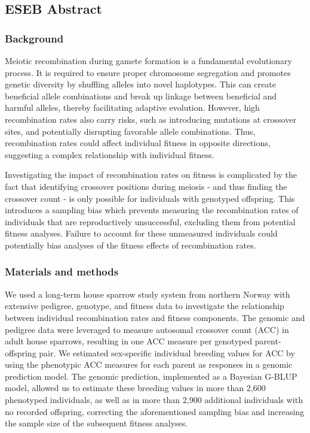 \documentclass[dvipsnames]{article}
\begin{document}

\maketitle
\newpage

\subsection*{ESEB Abstract}

\subsubsection*{Background}
Meiotic recombination during gamete formation is a fundamental evolutionary process. It is required to ensure proper chromosome segregation and promotes genetic diversity by shuffling alleles into novel haplotypes. This can create beneficial allele combinations and break up linkage between beneficial and harmful alleles, thereby facilitating adaptive evolution. However, high recombination rates also carry risks, such as introducing mutations at crossover sites, and potentially disrupting favorable allele combinations. Thus, recombination rates could affect individual fitness in opposite directions, suggesting a complex relationship with individual fitness.

Investigating the impact of recombination rates on fitness is complicated by the fact that identifying crossover positions during meiosis - and thus finding the crossover count - is only possible for individuals with genotyped offspring. This introduces a sampling bias which prevents measuring the recombination rates of individuals that are reproductively unsuccessful, excluding them from potential fitness analyses. Failure to account for these unmeasured individuals could potentially bias analyses of the fitness effects of recombination rates.

\subsubsection*{Materials and methods}
We used a long-term house sparrow study system from northern Norway with extensive pedigree, genotype, and fitness data to investigate the relationship between individual recombination rates and fitness components. The genomic and pedigree data were leveraged to measure autosomal crossover count (ACC) in adult house sparrows, resulting in one ACC measure per genotyped parent-offspring pair. We estimated sex-specific individual breeding values for ACC by using the phenotypic ACC measures for each parent as responses in a genomic prediction model. The genomic prediction, implemented as a Bayesian G-BLUP model, allowed us to estimate these breeding values in more than 2,600 phenotyped individuals, as well as in more than 2,900 additional individuals with no recorded offspring, correcting the aforementioned sampling bias and increasing the sample size of the subsequent fitness analyses.
\end{document}
